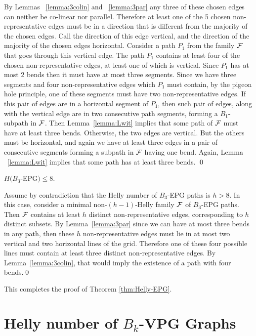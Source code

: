 By Lemmas ~\ref{lemma:3colin} and ~\ref{lemma:3par} any three of these chosen edges can  neither be co-linear nor parallel. Therefore at least one of the 5 chosen non-representative edges must be in a direction that is different from the majority of the chosen edges. Call the direction of this edge vertical, and the direction of the majority of the chosen edges horizontal. Consider a path $P_1$ from the family $\cal F$ that goes through this vertical edge. 
The path $P_1$ contains at least four of the chosen non-representative edges, at least one of which is vertical. Since $P_1$ has at most 2 bends then it must have at most three segments. Since we have three segments and four non-representative edges which $P_1$ must contain, by the pigeon hole principle, one of these segments must have two non-representative edges. If this pair of edges are in a horizontal segment of $P_1$, then such  pair of edges, along with the vertical edge are in two consecutive path segments, forming a $B_1$-subpath in $\cal F$. Then Lemma~\ref{lemma:Lwit} implies that some path of $\cal F$ must have at least three bends.   Otherwise, the two edges are vertical. But  the others must be horizontal, and again we have at least three edges in a pair of consecutive segments forming a subpath in $\cal F$ having one bend. Again,  Lemma ~\ref{lemma:Lwit} implies that some path has at least three bends.
\qed

\begin{lema}\label{claim:upper-B3}
$H(B_3$-EPG$) \leq 8.$
\end{lema}

\proof
Assume by contradiction that the Helly  number of  $B_3$-EPG paths is $h > 8$. In this case, consider a minimal non-$(h-1)$-Helly family $\cal F$ of $B_3$-EPG paths. Then $\cal F$ contains at least $h$  distinct non-representative edges,  corresponding to $h$ distinct subsets.  By Lemma~\ref{lemma:3par} since we can have at most three bends in any path, then these $h$  non-representative edges must lie in at most two vertical and two horizontal lines of the grid. Therefore one of these four possible lines must contain at least three distinct non-representative edges. By Lemma~\ref{lemma:3colin},  that would imply the existence of a path with four bends.\qed

This completes the proof of Theorem \ref{thm:Helly-EPG}. 


\section{Helly number of $B_k$-VPG Graphs}\label{sec:helly-vpg}

